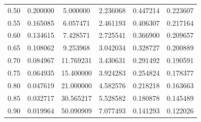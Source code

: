 \documentclass[10pt]{beamer}
\begin{document}
\begin{frame}
\begin{minipage}[b]{0.45\textwidth}
\begin{tiny}
\begin{table}[!hbp]
\begin{tabular}{cccccc}
			0.50 & 0.200000 & 5.000000 & 2.236068 & 0.447214 & 0.223607 \\   
		                                                         
			0.55 & 0.165085 & 6.057471 & 2.461193 & 0.406307 & 0.217164 \\   
			                                                         
			0.60 & 0.134615 & 7.428571 & 2.725541 & 0.366900 & 0.209657 \\   
		                                                         
			0.65 & 0.108062 & 9.253968 & 3.042034 & 0.328727 & 0.200889 \\   
		                                                          
			0.70 & 0.084967 & 11.769231 & 3.430631 & 0.291492 & 0.190591 \\  
		                                                         
			0.75 & 0.064935 & 15.400000 & 3.924283 & 0.254824 & 0.178377 \\  
			                                                          
			0.80 & 0.047619 & 21.000000 & 4.582576 & 0.218218 & 0.163663 \\  
		                                                         
			0.85 & 0.032717 & 30.565217 & 5.528582 & 0.180878 & 0.145489 \\  
			                                                         
			0.90 & 0.019964 & 50.090909 & 7.077493 & 0.141293 & 0.122026 \\  
			                                                           

\end{tabular}
\end{table}
\end{tiny}
\end{minipage}
\end{frame}
\end{document}
